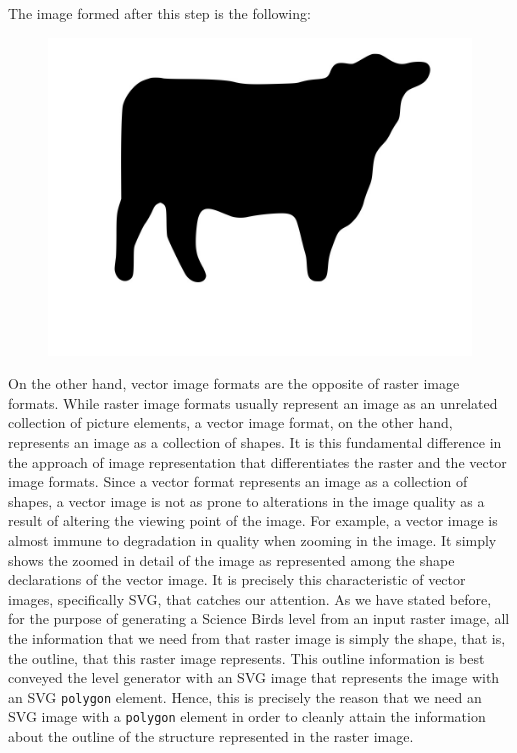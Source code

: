 \documentclass{dalthesis}
\begin{document}
\begin{enumerate}
  The image formed after this step is the following:

  \begin{figure}[H]
    \centering
    \includegraphics[width=\textwidth,height=\textheight,keepaspectratio]{process/cow-black-and-white-denoised-polygon.jpg}
  \end{figure}
\end{enumerate}

On the other hand, vector image formats are the opposite of raster image formats. While raster image formats usually represent an image as an unrelated collection of picture elements, a vector image format, on the other hand, represents an image as a collection of shapes. It is this fundamental difference in the approach of image representation that differentiates the raster and the vector image formats. Since a vector format represents an image as a collection of shapes, a vector image is not as prone to alterations in the image quality as a result of altering the viewing point of the image. For example, a vector image is almost immune to degradation in quality when zooming in the image. It simply shows the zoomed in detail of the image as represented among the shape declarations of the vector image. It is precisely this characteristic of vector images, specifically SVG, that catches our attention. As we have stated before, for the purpose of generating a Science Birds level from an input raster image, all the information that we need from that raster image is simply the shape, that is, the outline, that this raster image represents. This outline information is best conveyed the level generator with an SVG image that represents the image with an SVG \lstinline{polygon} element. Hence, this is precisely the reason that we need an SVG image with a \lstinline{polygon} element in order to cleanly attain the information about the outline of the structure represented in the raster image.
\end{document}
